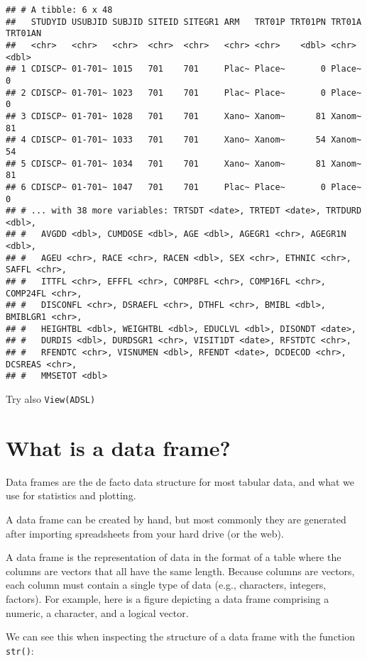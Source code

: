 \documentclass[]{book}
\begin{document}
\begin{verbatim}
## # A tibble: 6 x 48
##   STUDYID USUBJID SUBJID SITEID SITEGR1 ARM   TRT01P TRT01PN TRT01A TRT01AN
##   <chr>   <chr>   <chr>  <chr>  <chr>   <chr> <chr>    <dbl> <chr>    <dbl>
## 1 CDISCP~ 01-701~ 1015   701    701     Plac~ Place~       0 Place~       0
## 2 CDISCP~ 01-701~ 1023   701    701     Plac~ Place~       0 Place~       0
## 3 CDISCP~ 01-701~ 1028   701    701     Xano~ Xanom~      81 Xanom~      81
## 4 CDISCP~ 01-701~ 1033   701    701     Xano~ Xanom~      54 Xanom~      54
## 5 CDISCP~ 01-701~ 1034   701    701     Xano~ Xanom~      81 Xanom~      81
## 6 CDISCP~ 01-701~ 1047   701    701     Plac~ Place~       0 Place~       0
## # ... with 38 more variables: TRTSDT <date>, TRTEDT <date>, TRTDURD <dbl>,
## #   AVGDD <dbl>, CUMDOSE <dbl>, AGE <dbl>, AGEGR1 <chr>, AGEGR1N <dbl>,
## #   AGEU <chr>, RACE <chr>, RACEN <dbl>, SEX <chr>, ETHNIC <chr>, SAFFL <chr>,
## #   ITTFL <chr>, EFFFL <chr>, COMP8FL <chr>, COMP16FL <chr>, COMP24FL <chr>,
## #   DISCONFL <chr>, DSRAEFL <chr>, DTHFL <chr>, BMIBL <dbl>, BMIBLGR1 <chr>,
## #   HEIGHTBL <dbl>, WEIGHTBL <dbl>, EDUCLVL <dbl>, DISONDT <date>,
## #   DURDIS <dbl>, DURDSGR1 <chr>, VISIT1DT <date>, RFSTDTC <chr>,
## #   RFENDTC <chr>, VISNUMEN <dbl>, RFENDT <date>, DCDECOD <chr>, DCSREAS <chr>,
## #   MMSETOT <dbl>
\end{verbatim}

Try also \texttt{View(ADSL)}

\hypertarget{what-is-a-data-frame}{%
\section{What is a data frame?}\label{what-is-a-data-frame}}

Data frames are the de facto data structure for most tabular data, and what we use for statistics and plotting.

A data frame can be created by hand, but most commonly they are generated after importing spreadsheets from your hard drive (or the web).

A data frame is the representation of data in the format of a table where the columns are vectors that all have the same length. Because columns are vectors, each column must contain a single type of data (e.g., characters, integers, factors). For example, here is a figure depicting a data frame comprising a numeric, a character, and a logical vector.

We can see this when inspecting the structure of a data frame with the function \texttt{str()}:
\end{document}
